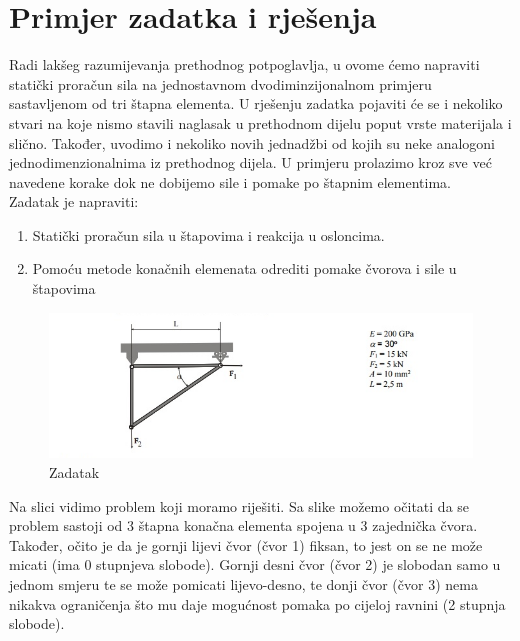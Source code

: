\documentclass[a4paper,twoside,12pt]{memoir} %
\begin{document}
\newpage
\section{Primjer zadatka i rješenja}
\label{primjer_zadatka_i_rjesenja}
Radi lakšeg razumijevanja prethodnog potpoglavlja, u ovome ćemo napraviti statički proračun sila na jednostavnom dvodiminzijonalnom primjeru sastavljenom od tri štapna elementa. U rješenju zadatka pojaviti će se i nekoliko stvari na koje nismo stavili naglasak u prethodnom dijelu poput vrste materijala i slično. Također, uvodimo i nekoliko novih jednadžbi od kojih su neke analogoni jednodimenzionalnima iz prethodnog dijela. U primjeru prolazimo kroz sve već navedene korake dok ne dobijemo sile i pomake po štapnim elementima. \\
Zadatak je napraviti: 
\begin{enumerate}
    \item Statički proračun sila u štapovima i reakcija u osloncima.
    \item Pomoću metode konačnih elemenata odrediti pomake čvorova i sile u štapovima
\end{enumerate}

\begin{figure}[h!t]
\begin{center}
\includegraphics[scale=0.6]{pictures/chapter_fem/problem_glavas.png}
\caption{Zadatak}
\label{fig:problem__not_noted}
\end{center}
\end{figure}

Na slici vidimo problem koji moramo riješiti. Sa slike možemo očitati da se problem sastoji od 3 štapna konačna elementa spojena u 3 zajednička čvora. Također, očito je da je gornji lijevi čvor (čvor 1) fiksan, to jest on se ne može micati (ima 0 stupnjeva slobode). Gornji desni čvor (čvor 2) je slobodan samo u jednom smjeru te se može pomicati lijevo-desno, te donji čvor (čvor 3) nema nikakva ograničenja što mu daje mogućnost pomaka po cijeloj ravnini (2 stupnja slobode). \\
\end{document}
